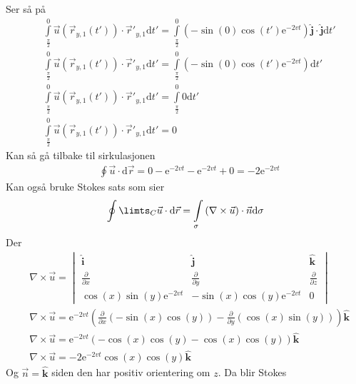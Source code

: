 \documentclass[a4paper,10pt,norsk]{article}
\newcommand{\dd}[1]{\mathrm{d}#1}
\newcommand{\uvec}[1]{\boldsymbol{\hat{\textbf{#1}}}}
\begin{document}
		Ser så på
		\begin{align*}
			&\int\limits_{\frac{\pi}{2}}^0 \vec{u} \left( \vec{r}_{y,1}(t') \right) \cdot \overrightarrow{r}'_{y,1} \dd{t'} = 
			\int\limits_{\frac{\pi}{2}}^0 \left( -\sin(0) \cos(t') \mathrm{e}^{-2vt}  \right) \uvec{j} \cdot \uvec{j} \dd{t'}\\
			&\int\limits_{\frac{\pi}{2}}^0 \vec{u} \left( \vec{r}_{y,1}(t') \right) \cdot \overrightarrow{r}'_{y,1} \dd{t'} =
			\int\limits_{\frac{\pi}{2}}^0 \left( -\sin(0) \cos(t') \mathrm{e}^{-2vt}  \right) \dd{t'}\\
			&\int\limits_{\frac{\pi}{2}}^0 \vec{u} \left( \vec{r}_{y,1}(t') \right) \cdot \overrightarrow{r}'_{y,1} \dd{t'} =
			\int\limits_{\frac{\pi}{2}}^0 0 \dd{t'}\\
			&\int\limits_{\frac{\pi}{2}}^0 \vec{u} \left( \vec{r}_{y,1}(t') \right) \cdot \overrightarrow{r}'_{y,1} \dd{t'} = 0
		\end{align*}
		Kan så gå tilbake til sirkulasjonen
		\begin{align*}
			&\oint \vec{u}  \cdot \dd{\vec{r} } = 0  - \mathrm{e}^{-2vt} - \mathrm{e}^{-2vt} + 0 = -2 \mathrm{e}^{-2vt}
		\end{align*}
		Kan også bruke Stokes sats som sier \[
			\oint\limts_C \vec{u} \cdot \dd{\vec{r}} = \int\limits_\sigma \left( \nabla \times \vec{u}  \right) \cdot \vec{n} \dd{\sigma}
		\] 
		Der 
		\begin{align*}
			& \nabla \times \vec{u} =
			\begin{vmatrix}
				\uvec{i} &\uvec{j} & \uvec{k}\\
				\frac{\partial }{\partial x} & \frac{\partial }{\partial y} & \frac{\partial }{\partial z} \\
				\cos(x) \sin(y) \mathrm{e}^{-2vt} & - \sin(x) \cos(y) \mathrm{e}^{-2vt} & 0
			\end{vmatrix}\\
			& \nabla \times \vec{u} = \mathrm{e}^{-2vt}\left( \frac{\partial }{\partial x} \left( -\sin(x) \cos(y)  \right) - \frac{\partial }{\partial y} \left( \cos(x) \sin(y)  \right)  \right)  \uvec{k}\\
			& \nabla \times \vec{u} = \mathrm{e}^{-2vt}\left( - \cos(x) \cos(y)  - \cos(x) \cos(y)  \right) \uvec{k}\\
			& \nabla \times \vec{u} = -2\mathrm{e}^{-2vt} \cos(x) \cos(y) \uvec{k}
		\end{align*}
		Og $\vec{n} = \uvec{k}$ siden den har positiv orientering om $z$. Da blir Stokes
\end{document}
